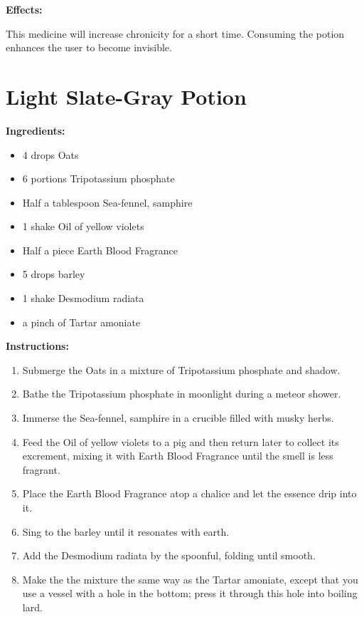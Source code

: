 \documentclass{article}
\begin{document}
\textbf{Effects:}

This medicine will increase chronicity for a short time. Consuming the potion enhances the user to become invisible.

\newpage
\section*{Light Slate-Gray Potion}

\textbf{Ingredients:}

\begin{itemize}
  \item 4 drops Oats
  \item 6 portions Tripotassium phosphate
  \item Half a tablespoon Sea-fennel, samphire
  \item 1 shake Oil of yellow violets
  \item Half a piece Earth Blood Fragrance
  \item 5 drops barley
  \item 1 shake Desmodium radiata
  \item a pinch of Tartar amoniate
\end{itemize}

\textbf{Instructions:}

\begin{enumerate}
  \item Submerge the Oats in a mixture of Tripotassium phosphate and shadow.
  \item Bathe the Tripotassium phosphate in moonlight during a meteor shower.
  \item Immerse the Sea-fennel, samphire in a crucible filled with musky herbs.
  \item Feed the Oil of yellow violets to a pig and then return later to collect its excrement, mixing it with Earth Blood Fragrance until the smell is less fragrant.
  \item Place the Earth Blood Fragrance atop a chalice and let the essence drip into it.
  \item Sing to the barley until it resonates with earth.
  \item Add the Desmodium radiata by the spoonful, folding until smooth.
  \item Make the the mixture the same way as the Tartar amoniate, except that you use a vessel with a hole in the bottom; press it through this hole into boiling lard.
\end{enumerate}
\end{document}
